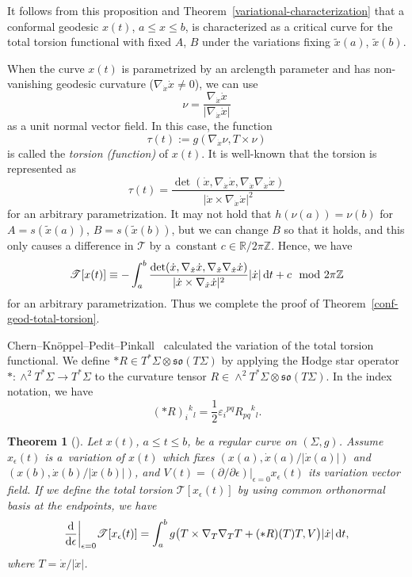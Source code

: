 \documentclass[pdftex]{sigma}
\numberwithin{equation}{section}
\newtheorem{Theorem}{Theorem}[section]
\begin{document}
It follows from this proposition and Theorem~\ref{variational-characterization} that a conformal geodesic $x(t)$, $a\le x\le b$, is characterized as a critical curve for the total torsion functional with fixed $A$, $B$ under the variations fixing $\tilde x(a)$, $\tilde x(b)$.

When the curve $x(t)$ is parametrized by an arclength parameter and has non-vanishing geodesic curvature ($\nabla_{\dot x}\dot x\neq 0$), we can use
\[
\nu=\frac{\nabla_{\dot x}\dot x}{|\nabla_{\dot x}\dot x|}
\]
as a unit normal vector field. In this case, the function
\[
\tau(t):=g(\nabla_{\dot x}\nu, T\times \nu)
\]
is called the {\it torsion (function)} of $x(t)$. It is well-known that the torsion is represented as
\[
\tau(t)=\frac{\det (\dot x, \nabla_{\dot x}\dot x, \nabla_{\dot x}\nabla_{\dot x}\dot x)}{|\dot x\times \nabla_{\dot x}\dot x|^2}
\]
for an arbitrary parametrization. It may not hold that $h(\nu(a))=\nu(b)$ for $A=s(\tilde x(a))$, ${B=s(\tilde x(b))}$, but we can change $B$ so that it holds, and this only causes a difference in $\mathscr{T}$ by a~constant $c\in\mathbb{R}/2\pi\mathbb{Z}$. Hence, we have
\[
\mathscr{T}[x(t)]\equiv-\int_a^b \frac{\det (\dot x, \nabla_{\dot x}\dot x, \nabla_{\dot x}\nabla_{\dot x}\dot x)}{|\dot x\times \nabla_{\dot x}\dot x|^2}|\dot x|\,{\rm d}t+c\mod 2\pi\mathbb{Z}
\]
for an arbitrary parametrization. Thus we complete the proof of Theorem~\ref{conf-geod-total-torsion}.

Chern--Kn\"oppel--Pedit--Pinkall~\cite{CKPP} calculated the variation of the total torsion functional.
We define $*R\in T^*\Sigma\otimes \mathfrak{so}(T\Sigma)$ by applying the Hodge star operator $*\colon \wedge^2 T^*\Sigma\to T^*\Sigma$ to the curvature tensor $R\in \wedge^2 T^*\Sigma\otimes \mathfrak{so}(T\Sigma)$. In the index notation, we have
\[
(*R)_i{}^k{}_l=\frac{1}{2}\varepsilon_i{}^{pq}R_{pq}{}^k{}_l.
\]

\begin{Theorem}[{\cite[Theorem 2]{CKPP}}]\label{variation-T}
Let $x(t)$, $a\le t \le b$, be a regular curve on $(\Sigma, g)$. Assume~$x_\epsilon (t)$
is a~variation of $x(t)$ which fixes $(x(a), \dot x(a)/|\dot x(a)|)$ and $(x(b), \dot x(b)/|\dot x(b)|)$, and $V(t)=(\partial/\partial \epsilon)|_{\epsilon=0}x_\epsilon(t)$ its variation vector field. If we define the total torsion $\mathscr{T}[x_\epsilon(t)]$ by using common orthonormal basis at the endpoints, we have
\[
\frac{\mathrm{d}}{\mathrm{d} \epsilon}\bigg|_{\epsilon=0}\mathscr{T}[x_\epsilon(t)]=
\int_a^b g\bigl(T\times \nabla_T\nabla_T T+(*R)(T)T, V\bigr)|\dot x|\,{\rm d}t,
\]
where $T=\dot x/|\dot x|$.
\end{Theorem}
\end{document}
